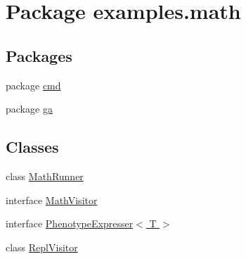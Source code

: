 \hypertarget{namespaceexamples_1_1math}{\section{Package examples.\-math}
\label{namespaceexamples_1_1math}
}
\subsection*{Packages}
\begin{DoxyCompactItemize}
\item 
package \hyperlink{namespaceexamples_1_1math_1_1cmd}{cmd}
\item 
package \hyperlink{namespaceexamples_1_1math_1_1ga}{ga}
\end{DoxyCompactItemize}
\subsection*{Classes}
\begin{DoxyCompactItemize}
\item 
class \hyperlink{classexamples_1_1math_1_1_math_runner}{Math\-Runner}
\item 
interface \hyperlink{interfaceexamples_1_1math_1_1_math_visitor}{Math\-Visitor}
\item 
interface \hyperlink{interfaceexamples_1_1math_1_1_phenotype_expresser_3_01_t_01_4}{Phenotype\-Expresser$<$ T $>$}
\item 
class \hyperlink{classexamples_1_1math_1_1_repl_visitor}{Repl\-Visitor}
\end{DoxyCompactItemize}
